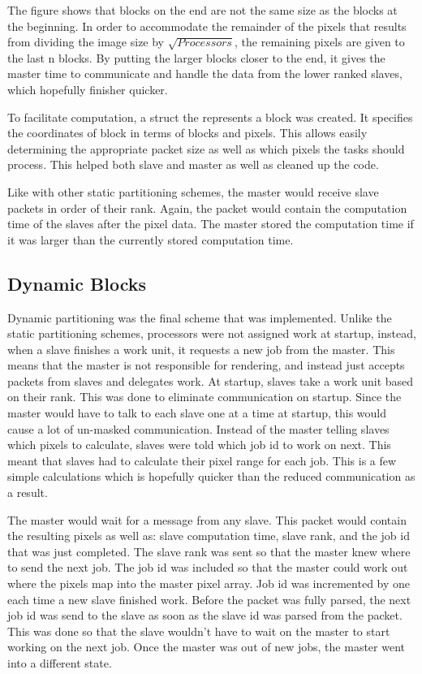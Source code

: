 \documentclass[11pt]{article}
\begin{document}
		The figure shows that blocks on the end are not the same size as the blocks at the beginning. In order to accommodate the remainder of the pixels that results from dividing the image size by $\sqrt{Processors}$, the remaining pixels are given to the last n blocks. By putting the larger blocks closer to the end, it gives the master time to communicate and handle the data from the lower ranked slaves, which hopefully finisher quicker. 
		
		To facilitate computation, a struct the represents a block was created. It specifies the coordinates of block in terms of blocks and pixels. This allows easily determining the appropriate packet size as well as which pixels the tasks should process. This helped both slave and master as well as cleaned up the code. 
		
		Like with other static partitioning schemes, the master would receive slave packets in order of their rank. Again, the packet would contain the computation time of the slaves after the pixel data. The master stored the computation time if it was larger than the currently stored computation time. 
	
	\subsection{Dynamic Blocks}
	
		Dynamic partitioning was the final scheme that was implemented. Unlike the static partitioning schemes, processors were not assigned work at startup, instead, when a slave finishes a work unit, it requests a new job from the master. This means that the master is not responsible for rendering, and instead just accepts packets from slaves and delegates work. At startup, slaves take a work unit based on their rank. This was done to eliminate communication on startup. Since the master would have to talk to each slave one at a time at startup, this would cause a lot of un-masked communication. Instead of the master telling slaves which pixels to calculate, slaves were told which job id to work on next. This meant that slaves had to calculate their pixel range for each job. This is a few simple calculations which is hopefully quicker than the reduced communication as a result.
		
		The master would wait for a message from any slave. This packet would contain the resulting pixels as well as: slave computation time, slave rank, and the job id that was just completed. The slave rank was sent so that the master knew where to send the next job. The job id was included so that the master could work out where the pixels map into the master pixel array. Job id was incremented by one each time a new slave finished work. Before the packet was fully parsed, the next job id was send to the slave as soon as the slave id was parsed from the packet. This was done so that the slave wouldn't have to wait on the master to start working on the next job. Once the master was out of new jobs, the master went into a different state. 
		
\end{document}
